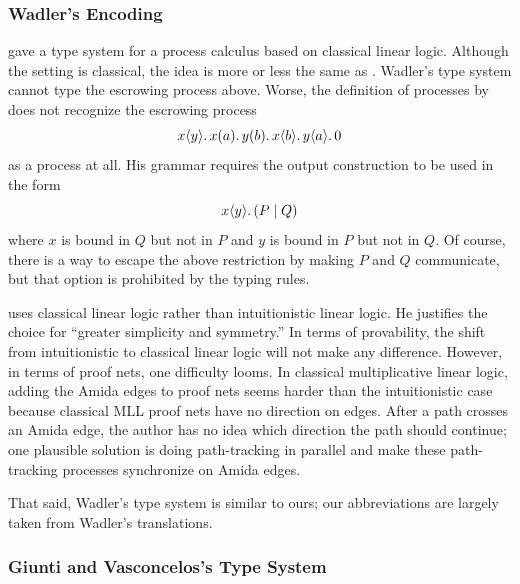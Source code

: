 \subsubsection{Wadler's Encoding}

\citet{wadler2012propositions} gave a type system for a process
calculus based on classical linear logic.
Although the setting is classical, the idea is more or less the same as
\citet{pfenning2010}.
Wadler's type system cannot type the escrowing process above.
Worse, the definition of processes by \citet{wadler2012propositions}
does not recognize the escrowing process
\[
 {x}\langle{y}\rangle.\,{{{x}({a}).\,{{{y}({b}).\,{{x}\langle{b}\rangle.\,{{y}\langle{a}\rangle.\,{0}}}}}}}
\]
as a process at all.
His grammar requires the output construction to be used in the form
\[
 {x}\langle{y}\rangle.\,{(P\mid Q)}
\]
where $x$ is bound in $Q$ but not in $P$ and $y$ is bound in $P$ but not
in $Q$.
Of course, there is a way to escape the above restriction by making $P$
and $Q$ communicate, but that option is prohibited by the typing rules.

\citet{wadler2012propositions} uses classical linear logic rather than
intuitionistic linear
logic.
He justifies the choice for ``greater simplicity and symmetry.''
In terms of provability, the shift from intuitionistic to classical
linear logic will not make any difference.  However, in terms of proof nets,
one difficulty looms.  In classical multiplicative linear logic,
adding the Amida edges to proof nets seems harder than the intuitionistic case
because classical MLL proof nets have no direction on edges.
After a path crosses an Amida edge, the author has no idea which
direction the path should continue; one plausible solution is doing
path-tracking in parallel and make these path-tracking processes synchronize
on Amida edges.

That said,
Wadler's type system is similar to ours;
our abbreviations are largely taken from Wadler's translations.

\subsubsection{Giunti and Vasconcelos's Type System}


